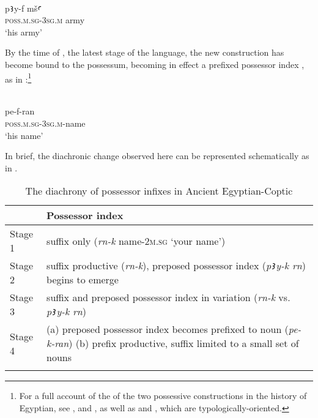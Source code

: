 \documentclass[output=paper]{LSP/langsci}
\begin{document}
\begin{exe}
\ex%
\label{05-gr-ex:33}
\\
\gll p\texttt{Ꜣ}y-f mš\texttt{Ꜥ}\\
\textsc{poss.m.sg-3sg.m} army\\
\glt ‘his army’
\end{exe}


By the time of , the latest stage of the language, the new construction has become bound to the possessum, becoming in effect a prefixed possessor index \citep{Grossman2016Noun}, as in :\footnote{For a full account of the  of the two possessive constructions in the history of Egyptian, see \citet{GardinerSpread}, \citet{SojicEmergence} and \citet{WinandPronominal}, as well as \citet{Haspelmath2015Three} and \citet{Kammerzell2000Egyptian}, which are typologically-oriented.} 

\begin{exe}
\ex%
\label{05-gr-ex:34}
\\
\gll pe-f-ran\\
\textsc{poss.m.sg-3sg.m-}name\\
\glt ‘his name’
\end{exe}

In brief, the diachronic change observed here can be represented schematically as in .


\begin{table}
\begin{tabularx}{\textwidth}{lQ} 
\lsptoprule
& Possessor index\\
\midrule
Stage 1 & suffix only (\textit{rn-k} name-\textsc{2m.sg} ‘your name’)\\
Stage 2 & suffix productive (\textit{rn-k}), preposed possessor index (\textit{p\texttt{Ꜣ}y-k rn}) begins to emerge\\
Stage 3 & suffix and preposed possessor index in variation (\textit{rn-k} vs. \textit{p\texttt{Ꜣ}y-k rn})\\
Stage 4 & (a) preposed possessor index becomes prefixed to noun (\textit{pe-k-ran})
(b) prefix productive, suffix limited to a small set of nouns\\
\lspbottomrule
\end{tabularx}
\caption{The diachrony of possessor infixes in Ancient Egyptian-Coptic}\label{05-gr:tab:5}
\end{table}
\end{document}
